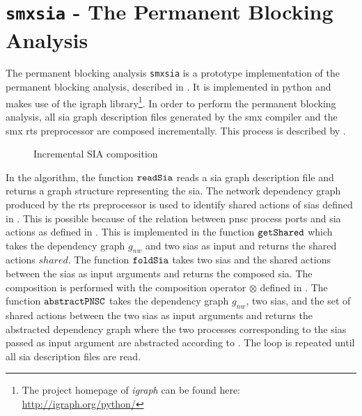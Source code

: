 \section{\texttt{smxsia} - The Permanent Blocking Analysis}
\label{sect_tool_smxsia}
The permanent blocking analysis \texttt{smxsia} is a prototype implementation of the permanent blocking analysis, described in \Chap{\ref{chap_block}}.
It is implemented in python and makes use of the igraph library\footnote{The project homepage of \emph{igraph} can be found here: \url{http://igraph.org/python/}}.
In order to perform the permanent blocking analysis, all \gls{sia} graph description files generated by the \gls*{smx} compiler and the \gls*{smx} \gls{rts} preprocessor are composed incrementally.
This process is described by \Alg{\ref{alg_smxsia}}.
\begin{figure}[bht]
    \TopAlgSpace
    \removelatexerror
    \begin{algorithm}[H]
        \caption{Incremental SIA composition}
        \label{alg_smxsia}
        \begin{algorithmic}[1]
            \Statex
            \EndWhile
        \end{algorithmic}
    \end{algorithm}
    \BotAlgSpace
\end{figure}
In the algorithm, the function $\textnormal{\tt readSia}$ reads a \gls{sia} graph description file and returns a graph structure representing the \gls{sia}.
The network dependency graph produced by the \gls{rts} preprocessor is used to identify shared actions of \glspl{sia} defined in \Equ{\ref{eq_shared_actions}}.
This is possible because of the relation between \gls{pnsc} process ports and \gls{sia} actions as defined in \Sect{\ref{sect_sia_proc}}.
This is implemented in the function $\textnormal{\tt getShared}$ which takes the dependency graph $g_{nw}$ and two \glspl{sia} as input and returns the shared actions $shared$.
The function $\textnormal{\tt foldSia}$ takes two \glspl{sia} and the shared actions between the \glspl{sia} as input arguments and returns the composed \gls{sia}.
The composition is performed with the composition operator $\otimes$ defined in \Def{\ref{def_sia_comp}}.
The function $\textnormal{\tt abstractPNSC}$ takes the dependency graph $g_{nw}$, two \glspl{sia}, and the set of shared actions between the two \glspl{sia} as input arguments and returns the abstracted dependency graph where the two processes corresponding to the \glspl{sia} passed as input argument are abstracted according to \Def{\ref{def_proc_composed}}.
The loop is repeated until all \gls{sia} description files are read.

